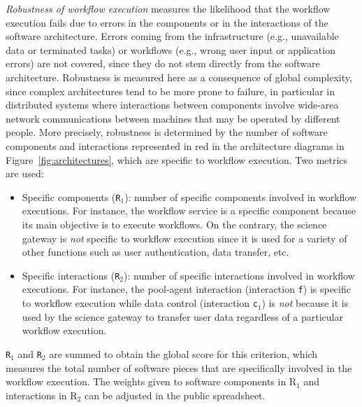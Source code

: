 \documentclass[preprint,3p,twocolumn]{elsarticle}
\newcommand{\correction}[1]{\color{blue}#1\color{black}\xspace}
\begin{document}
\emph{Robustness of workflow execution} measures the likelihood that
the workflow execution fails due to errors in the components or in the
interactions of the software architecture. Errors coming from the
infrastructure (e.g., unavailable data or terminated tasks) or
workflows (e.g., wrong user input or application errors) are not
covered, since they do not stem directly from the software
architecture.  Robustness is measured here as a consequence of global
complexity, since complex architectures tend to be more prone to
failure, \correction{in particular in distributed systems where
  interactions between components involve wide-area network
  communications between machines that may be operated by different
  people}. More precisely, robustness is determined by the number of
software components and interactions represented in red in the
architecture diagrams in Figure~\ref{fig:architectures}, which are
specific to workflow execution. Two metrics are used:
\begin{itemize}[leftmargin=0cm,itemindent=0.35cm,itemsep=0cm]
\item Specific components (\texttt{R$_1$}): number of specific
  components involved in workflow executions. \correction{For instance, the
  workflow service is a specific component because its main objective
  is to execute workflows. On the contrary, the science gateway is
  \emph{not} specific to workflow execution since it is used for a
  variety of other functions such as user authentication, data
  transfer, etc.}
\item Specific interactions (\texttt{R$_2$}): number of specific
  interactions involved in workflow executions. \correction{For
    instance, the pool-agent interaction (interaction \texttt{f}) is
    specific to workflow execution while data control (interaction
    \texttt{c$_1$}) is \emph{not} because it is used by the science gateway to transfer
    user data regardless of a particular workflow execution}.
\end{itemize}
\texttt{R$_1$} and \texttt{R$_2$} are
summed to obtain the global score for this criterion, which measures
the total number of software pieces that are specifically involved in
the workflow execution. \correction{The weights given to software components in R$_1$ and interactions in R$_2$ can be adjusted in the public spreadsheet.}
\end{document}

